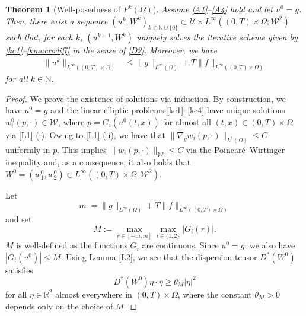 \documentclass[11pt]{article}
\newtheorem{theorem}{Theorem}
\newcommand{\timeint}{(0,T)}
\begin{document}
\begin{theorem}[Well-posedness of $P^k(\Omega)$]
\label{theorem_well_posedness}
   Assume \ref{A1}--\ref{A4} hold and let $u^0 = g$. Then, there exist a sequence $(u^{k},W^k)_{k\in \mathbb{N}\cup\{0\}}\subset\mathcal{U}\times L^\infty(\timeint\times\Omega;\mathcal{W}^2)$ such that, for each $k$, $(u^{k+1},W^k)$ uniquely solves the iterative scheme given by \eqref{kc1}--\eqref{kmacrodiff} in the sense of \cref{D2}.
  Moreover, we have 
\begin{align}
  \|u^{k}\|_{L^{\infty}(\timeint\times\Omega)}&\leq \|g\|_{L^\infty(\Omega)}+T\|f\|_{L^{\infty}(\timeint\times\Omega)}\label{T1e1}
\end{align}
   for all $k\in \mathbb{N}$.
\end{theorem}
\begin{proof}
We prove the existence of solutions via induction.
By construction, we have $u^0=g$ and the linear elliptic problems \eqref{kc1}--\eqref{kc4} have unique solutions $w_i^0(p,\cdot)\in \mathcal{W}$, where $p=G_i(u^0(t,x))$ for almost all $(t,x)\in \timeint\times\Omega$ via \cref{L1} (i). 
Owing to \cref{L1} (ii), we have that $\|\nabla_y w_i(p,\cdot)\|_{L^2(\Omega)}\leq C$ uniformly in $p$.
This implies $\|w_i(p,\cdot)\|_{\mathcal{W}}\leq C$ via the Poincaré–Wirtinger inequality and, as a consequence, it also holds that $W^0=(w_1^0,w_2^0)\in L^\infty(\timeint\times\Omega;\mathcal{W}^2)$.
\par Let
%
\begin{equation*}
    m:=\|g\|_{L^\infty(\Omega)}+T\|f\|_{L^{\infty}(\timeint\times\Omega)}
\end{equation*}
%
and set
%
\begin{equation*}
    M:=\max_{r\in[-m,m]}\max_{i\in\{1,2\}} |G_i(r)|.
\end{equation*}
%
$M$ is well-defined as the functions $G_i$ are continuous.
Since $u^0=g$, we also have $|G_i(u^0)|\leq M$.
Using Lemma \ref{L2}, we see that the dispersion tensor $D^*(W^0)$ satisfies
%
\begin{equation*}
    D^*(W^0)\eta \cdot \eta\geq\theta_M|\eta|^2
\end{equation*}
%
 for all $\eta \in \mathbb{R}^2$ almost everywhere in $\timeint\times\Omega$, where the constant $\theta_M>0$ depends only on the choice of $M$.


\end{proof}
\end{document}
